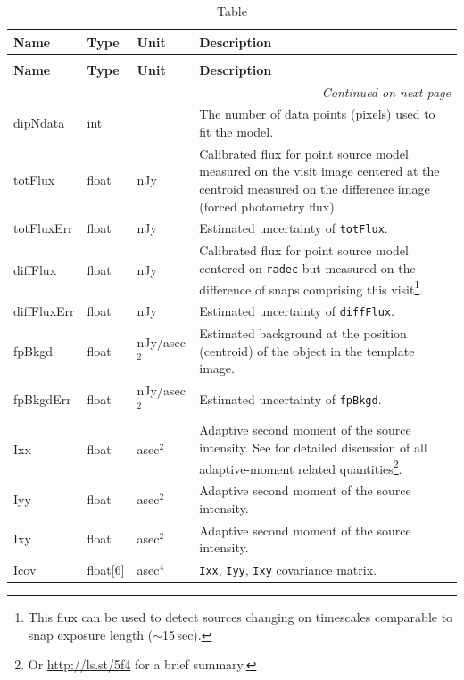 \documentclass[SE,lsstdraft,toc]{lsstdoc}
\newenvironment{schema}[3]{%
\setlength\LTleft{0pt}
\setlength\LTright{\fill}
\begin{longtable}{p{0.2\textwidth}p{0.14\textwidth}p{0.14\textwidth}p{0.41\textwidth}}

\caption[#1]{#2\label{#3}}\\

\hline \textbf{Name} & \textbf{Type} & \textbf{Unit} & \textbf{Description}\\ \hline
\endfirsthead

\caption[#1]{#2}\\

\hline \textbf{Name} & \textbf{Type} & \textbf{Unit} & \textbf{Description}\\ \hline
\endhead

\hline \multicolumn{4}{r}{\emph{Continued on next page}} \\
\endfoot

\hline\hline
\endlastfoot
}{%
\hline
\end{longtable}
}
\begin{document}
\begin{schema}{\DIASource Table}{\DIASource Table}{tbl:diasourceTable}
dipNdata & int & ~ & The number of data points (pixels) used to fit the model. \\

totFlux & float & nJy & Calibrated flux for point source model measured on the visit image centered at the centroid measured on the difference image (forced photometry flux) \\

totFluxErr & float & nJy & Estimated uncertainty of \texttt{totFlux}. \\

diffFlux & float & nJy & Calibrated flux for point source model centered on \texttt{radec} but measured on the difference of snaps comprising this visit\footnote{This flux can be used to detect sources changing on timescales comparable to snap exposure length ($\sim$15\,sec).}. \\

diffFluxErr & float & nJy & Estimated uncertainty of \texttt{diffFlux}. \\

fpBkgd & float & nJy/asec$^{2}$ & Estimated background at the position (centroid) of the object in
the template image. \\

fpBkgdErr & float & nJy/asec$^{2}$ & Estimated uncertainty of \texttt{fpBkgd}. \\



Ixx & float & asec$^{2}$  & Adaptive second moment of the source intensity. See \citet{2002AJ....123..583B} for detailed discussion of all adaptive-moment related quantities\footnote{Or \url{http://ls.st/5f4} for a brief summary.}. \\

Iyy & float & asec$^{2}$ & Adaptive second moment of the source intensity. \\

Ixy & float & asec$^{2}$ & Adaptive second moment of the source intensity. \\

Icov & float[6] & asec$^{4}$ & \texttt{Ixx}, \texttt{Iyy}, \texttt{Ixy} covariance matrix. \\


\end{schema}
\end{document}
